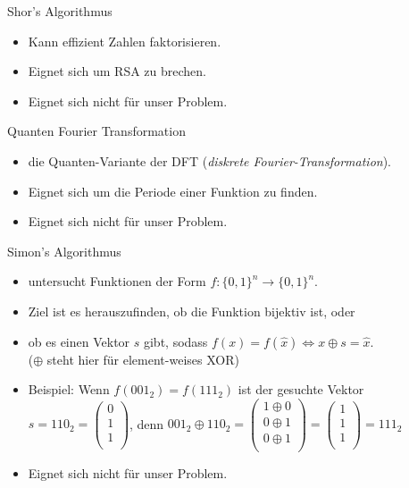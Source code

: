 \documentclass[fleqn,compress,utf8,aspectratio=169,t]{beamer}
\begin{document}
\begin{frame}{Shor's Algorithmus}
\begin{itemize}
	\item Kann effizient Zahlen faktorisieren.
	\item Eignet sich um RSA zu brechen.
	\item Eignet sich nicht für unser Problem.
\end{itemize}
\end{frame}

\begin{frame}{Quanten Fourier Transformation}
\begin{itemize}
	\item die Quanten-Variante der DFT (\textit{diskrete Fourier-Transformation}).
	\item Eignet sich um die Periode einer Funktion zu finden.
	\item Eignet sich nicht für unser Problem.
\end{itemize}
\end{frame}

\begin{frame}{Simon's Algorithmus}
\begin{itemize}
	\item untersucht Funktionen der Form $f: \{0, 1\}^n \rightarrow \{0, 1\}^n$.
	\item Ziel ist es herauszufinden, ob die Funktion bijektiv ist, oder
	\item ob es einen Vektor $s$ gibt, sodass $f(x) = f(\hat{x}) \Leftrightarrow x \oplus s = \hat{x}$.\\
	($\oplus$ steht hier für element-weises XOR)
	\item Beispiel: Wenn $f(001_2) = f(111_2)$ ist der gesuchte Vektor\\
	$s = 110_2 = 
	\begin{pmatrix}
	0 \\
	1 \\
	1 \\
	\end{pmatrix}$,
	denn $001_2 \oplus 110_2 =
	\begin{pmatrix}
	1 \oplus 0 \\
	0 \oplus 1 \\
	0 \oplus 1 \\
	\end{pmatrix}
	=
	\begin{pmatrix}
	1 \\
	1 \\
	1 \\
	\end{pmatrix}
	= 111_2$
	\item Eignet sich nicht für unser Problem.
\end{itemize}
\end{frame}
\end{document}
